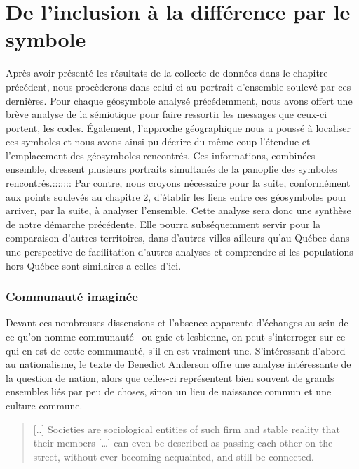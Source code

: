 
\chapter{De l'inclusion à la différence par le symbole}
\label{cha:de_l_inclusion_la_diff_rence_par_le_symbole}

Après avoir présenté les résultats de la collecte de données dans le chapitre précédent, nous procèderons dans celui-ci au portrait d'ensemble soulevé par ces dernières.
Pour chaque géosymbole analysé précédemment, nous avons offert une brève analyse de la sémiotique pour faire ressortir les messages que ceux-ci portent, les codes.
Également, l'approche géographique nous a poussé à localiser ces symboles et nous avons ainsi pu décrire du même coup l'étendue et l'emplacement des géosymboles rencontrés.
Ces informations, combinées ensemble, dressent plusieurs portraits simultanés de la panoplie des symboles rencontrés.:::::::
Par contre, nous croyons nécessaire pour la suite, conformément aux points soulevés au chapitre 2, d'établir les liens entre ces géosymboles pour arriver, par la suite, à analyser l'ensemble.
Cette analyse sera donc une synthèse de notre démarche précédente.
Elle pourra subséquemment servir pour la comparaison d'autres territoires, dans d'autres villes ailleurs qu'au Québec dans une perspective de facilitation d'autres analyses et comprendre si les populations \lgbt{} hors Québec sont similaires a celles d'ici.


\subsection{Communauté imaginée}
\label{sub:communaut_imagin_e}
Devant ces nombreuses dissensions et l'absence apparente d'échanges au sein de ce qu'on nomme communauté~\lgbt{} ou gaie et lesbienne, on peut s'interroger sur ce qui en est de cette communauté, s'il en est vraiment une.
S'intéressant d'abord au nationalisme, le texte de Benedict Anderson offre une analyse intéressante de la question de nation, alors que celles-ci représentent bien souvent de grands ensembles liés par peu de choses, sinon un lieu de naissance commun et une culture commune.
\begin{quote}	
[..] Societies are sociological entities of such firm and stable reality that their members […] can even be described as passing each other on the street, without ever becoming acquainted, and still be connected.~\citep[25]{Anderson1983}
\end{quote}

